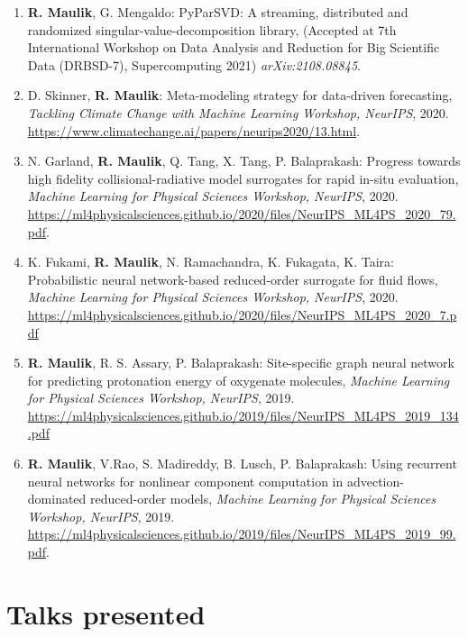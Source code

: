 \documentclass[letterpaper]{article}
\begin{document}
\begin{enumerate}

\item \textbf{R. Maulik}, G. Mengaldo: PyParSVD: A streaming, distributed and randomized singular-value-decomposition library, (Accepted at 7th International Workshop on Data Analysis and Reduction for Big Scientific Data (DRBSD-7), Supercomputing 2021) {\it arXiv:2108.08845}.

\item D. Skinner, \textbf{R. Maulik}: Meta-modeling strategy for data-driven forecasting, \textit{Tackling Climate Change with Machine Learning Workshop, NeurIPS}, 2020. \url{https://www.climatechange.ai/papers/neurips2020/13.html}. 

\item N. Garland, \textbf{R. Maulik}, Q. Tang, X. Tang, P. Balaprakash: Progress towards high fidelity collisional-radiative model surrogates for rapid in-situ evaluation, \textit{Machine Learning for Physical Sciences Workshop, NeurIPS}, 2020. \url{https://ml4physicalsciences.github.io/2020/files/NeurIPS_ML4PS_2020_79.pdf}.

\item K. Fukami, \textbf{R. Maulik}, N. Ramachandra, K. Fukagata, K. Taira: Probabilistic neural network-based reduced-order surrogate for fluid flows, \textit{Machine Learning for Physical Sciences Workshop, NeurIPS}, 2020. \url{https://ml4physicalsciences.github.io/2020/files/NeurIPS_ML4PS_2020_7.pdf}

\item \textbf{R. Maulik}, R. S. Assary, P. Balaprakash: Site-specific graph neural network for predicting protonation energy of oxygenate molecules, {\it Machine Learning for Physical Sciences Workshop, NeurIPS}, 2019. \url{https://ml4physicalsciences.github.io/2019/files/NeurIPS_ML4PS_2019_134.pdf}

\item \textbf{R. Maulik}, V.Rao, S. Madireddy, B. Lusch, P. Balaprakash: Using recurrent neural networks for nonlinear component computation in advection-dominated reduced-order models, \textit{Machine Learning for Physical Sciences Workshop, NeurIPS}, 2019. \url{https://ml4physicalsciences.github.io/2019/files/NeurIPS_ML4PS_2019_99.pdf}.

\end{enumerate}



\section*{Talks presented}
\end{document}
